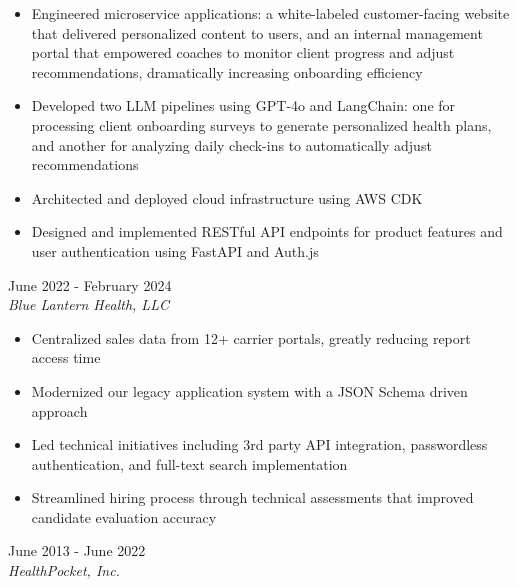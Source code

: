 \documentclass{resume}
\begin{document}
\begin{spacing}{1.2}
\begin{paracol}{2}
		\nointerlineskip
		\begin{itemize}
			\item Engineered microservice applications: a white-labeled customer-facing website that delivered personalized content to users, and an internal management portal that empowered coaches to monitor client progress and adjust recommendations, dramatically increasing onboarding efficiency
			\item Developed two LLM pipelines using GPT-4o and LangChain: one for processing client onboarding surveys to generate personalized health plans, and another for analyzing daily check-ins to automatically adjust recommendations
			\item Architected and deployed cloud infrastructure using AWS CDK
			\item Designed and implemented RESTful API endpoints for product features and user authentication using FastAPI and Auth.js
		\end{itemize}

		\medskip

		{\large{}}
		\hfill{\color{subcontent} June 2022 - February 2024}\\
		\textit{Blue Lantern Health, LLC}
		
		\nointerlineskip
		\begin{itemize}
			\item Centralized sales data from 12+ carrier portals, greatly reducing report access time
			\item Modernized our legacy application system with a JSON Schema driven approach
			\item Led technical initiatives including 3rd party API integration, passwordless authentication, and full-text search implementation
			\item Streamlined hiring process through technical assessments that improved candidate evaluation accuracy
		\end{itemize}

		\medskip

		{\large{}}
		\hfill{\color{subcontent} June 2013 - June 2022}\\
		\textit{HealthPocket, Inc.}


\end{paracol}
\end{spacing}
\end{document}
